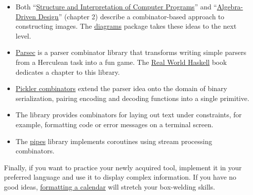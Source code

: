 \documentclass{article}
\begin{document}
\begin{itemize}
\item
Both ``\href{https://mitp-content-server.mit.edu/books/content/sectbyfn/books_pres_0/6515/sicp.zip/full-text/book/book-Z-H-15.html#%25_sec_2.2.4}{Structure and Interpretation of Computer Programs}''
and ``\href{https://www.goodreads.com/book/show/53001511-algebra-driven-design}{Algebra-Driven Design}''
(chapter 2) describe a combinator-based approach to constructing images.
The \href{https://diagrams.github.io/}{diagrams} package takes these ideas to the next level.
\item
\href{https://hackage.haskell.org/package/parsec}{Parsec} is a parser combinator library
that transforms writing simple parsers from a Herculean task into a fun game.
The \href{https://book.realworldhaskell.org/read/using-parsec.html}{Real World Haskell} book dedicates a chapter to this library.
\item
\href{https://www.microsoft.com/en-us/research/wp-content/uploads/2004/01/picklercombinators.pdf}{Pickler combinators} extend the parser idea onto the domain of binary serialization,
pairing encoding and decoding functions into a single primitive.
\item
The \href{https://hackage.haskell.org/package/prettyprinter-1.7.1/docs/Prettyprinter.html}{}
library provides combinators for laying out text under constraints,
for example, formatting code or error messages on a terminal screen.
\item
The \href{https://hackage.haskell.org/package/pipes-4.3.16/docs/Pipes-Tutorial.html}{pipes}
library implements coroutines using stream processing combinators.
\end{itemize}

Finally, if you want to practice your newly acquired tool,
implement it in your preferred language and use it to display complex information.
If you have no good ideas, \href{https://wiki.dlang.org/Component_programming_with_ranges#Case_Study:_Formatting_a_Calendar}{formatting a calendar}
will stretch your box-welding skills.
\end{document}
